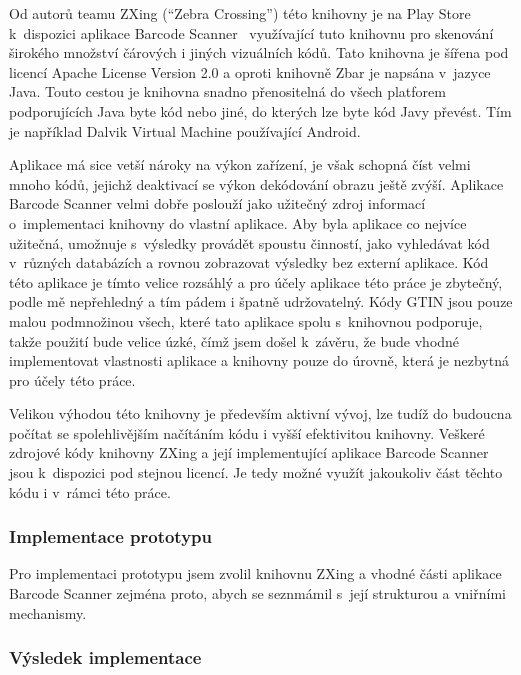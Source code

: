\documentclass[thesis=B,czech]{FITthesis}[2013/10/20]
\begin{document}
Od autorů teamu ZXing (``Zebra Crossing'') této knihovny je na Play Store k~dispozici aplikace Barcode Scanner~\cite{barcode_scanner} využívající tuto knihovnu pro skenování širokého množství čárových i jiných vizuálních kódů. Tato knihovna je šířena pod licencí Apache License Version 2.0 a oproti knihovně Zbar je napsána v~jazyce Java. Touto cestou je knihovna snadno přenositelná do všech platforem podporujících Java byte kód nebo jiné, do kterých lze byte kód Javy převést. Tím je například Dalvik Virtual Machine používající Android.

Aplikace má sice vetší nároky na výkon zařízení, je však schopná číst velmi mnoho kódů, jejichž deaktivací se výkon dekódování obrazu ještě zvýší. Aplikace Barcode Scanner velmi dobře poslouží jako užitečný zdroj informací o~implementaci knihovny do vlastní aplikace. Aby byla aplikace co nejvíce užitečná, umožnuje s~výsledky provádět spoustu činností, jako vyhledávat kód v~různých databázích a rovnou zobrazovat výsledky bez externí aplikace. Kód této aplikace je tímto velice rozsáhlý a pro účely aplikace této práce je zbytečný, podle mě nepřehledný a tím pádem i špatně udržovatelný. Kódy GTIN jsou pouze malou podmnožinou všech, které tato aplikace spolu s~knihovnou podporuje, takže použití bude velice úzké, čímž jsem došel k~závěru, že bude vhodné implementovat vlastnosti aplikace a knihovny pouze do úrovně, která je nezbytná pro účely této práce.

Velikou výhodou této knihovny je především aktivní vývoj, lze tudíž do budoucna počítat se spolehlivějším načítáním kódu i vyšší efektivitou knihovny. Veškeré zdrojové kódy knihovny ZXing a její implementující aplikace Barcode Scanner jsou k~dispozici pod stejnou licencí. Je tedy možné využít jakoukoliv část těchto kódu i v~rámci této práce. 

\subsubsection{Implementace prototypu}

Pro implementaci prototypu jsem zvolil knihovnu ZXing a vhodné části aplikace Barcode Scanner zejména proto, abych se seznmámil s~její strukturou a vniřními mechanismy. 

\subsubsection{Výsledek implementace}
\end{document}
